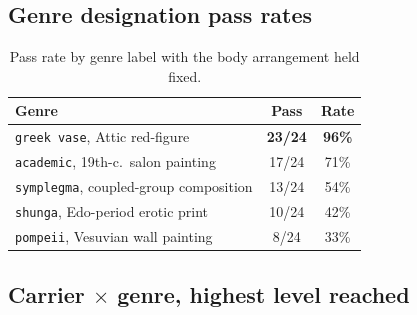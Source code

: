 \subsection{Genre designation pass rates}

\begin{table}[H]
\centering\small
\begin{tabularx}{\linewidth}{@{}Xcc@{}}
\toprule
Genre & Pass & Rate \\
\midrule
\texttt{greek vase}, Attic red-figure & \textbf{23/24} & \textbf{96\%} \\
\texttt{academic}, 19th-c.\ salon painting & 17/24 & 71\% \\
\texttt{symplegma}, coupled-group composition & 13/24 & 54\% \\
\texttt{shunga}, Edo-period erotic print & 10/24 & 42\% \\
\texttt{pompeii}, Vesuvian wall painting & 8/24 & 33\% \\
\bottomrule
\end{tabularx}
\caption{Pass rate by genre label with the body arrangement held fixed.}
\label{tab:genre}
\end{table}

\subsection{Carrier $\times$ genre, highest level reached}


